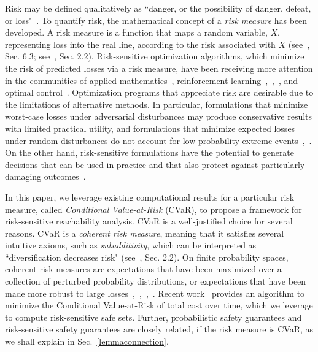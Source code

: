\documentclass[letterpaper, 10 pt, conference]{ieeeconf}  %
\begin{document}
Risk may be defined qualitatively as ``danger, or the possibility of danger, defeat, or loss"~\cite{riskdef}.
To quantify risk, the mathematical concept of a \textit{risk measure} has been developed.
A risk measure is a function that maps a random variable, $X$, representing loss into the real line,
according to the risk associated with $X$ (see~\cite{shapiro2009lectures}, Sec. 6.3; see~\cite{kisiala2015conditional}, Sec. 2.2).
Risk-sensitive optimization algorithms, which minimize the risk of predicted losses via a risk measure,
have been receiving more attention in the communities of applied mathematics~\cite{ruszczynski2010risk}, reinforcement learning~\cite{osogami2012robustness},~\cite{chow2015risk},~\cite{ratliff2017risk}, and optimal control~\cite{chow2014framework}.
Optimization programs that appreciate risk are desirable due to the limitations of alternative methods.
In particular, formulations that minimize worst-case losses under adversarial disturbances
may produce conservative results with limited practical utility, and formulations that minimize expected losses under random disturbances do not account for low-probability extreme events~\cite{chow2014framework},~\cite{jha2018safe}. 
On the other hand, risk-sensitive formulations have the potential to generate decisions that can be used in practice and that also protect
against particularly damaging outcomes~\cite{serraino2013conditional}.

In this paper, we leverage existing computational results for a particular risk measure, called \textit{Conditional Value-at-Risk} (CVaR),
to propose a framework for risk-sensitive reachability analysis. 
CVaR is a well-justified choice for several reasons.
CVaR is a \textit{coherent risk measure}, meaning that it satisfies several intuitive axioms, such as \textit{subadditivity},
which can be interpreted as ``diversification decreases risk" (see~\cite{kisiala2015conditional}, Sec. 2.2).
On finite probability spaces, coherent risk measures are expectations that have been maximized over a collection of perturbed probability distributions,
or expectations that have been made more robust to large losses~\cite{chow2014framework},~\cite{shapiro2009lectures},~\cite{chow2015risk},~\cite{artzner1999coherent}.
Recent work~\cite{chow2015risk} provides an algorithm to minimize the Conditional Value-at-Risk of total cost over time, 
which we leverage to compute risk-sensitive safe sets. Further, probabilistic safety guarantees and 
risk-sensitive safety guarantees are closely related, if the risk measure is CVaR, as we shall explain in Sec.~\ref{lemmaconnection}.
\end{document}
